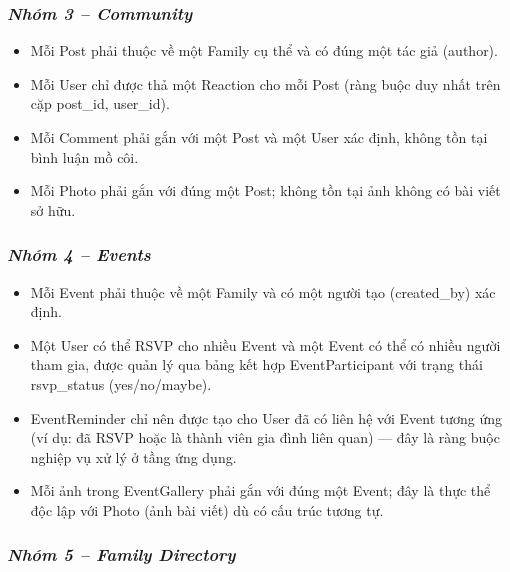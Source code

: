 \hypertarget{nhuxf3m-3-community}{%
\subsubsection{\texorpdfstring{\emph{\textbf{Nhóm 3 -- Community}}}{Nhóm 3 -- Community}}\label{nhuxf3m-3-community}}

\begin{itemize}
\item
  Mỗi Post phải thuộc về một Family cụ thể và có đúng một tác giả (author).
\item
  Mỗi User chỉ được thả một Reaction cho mỗi Post (ràng buộc duy nhất trên cặp post\_id, user\_id).
\item
  Mỗi Comment phải gắn với một Post và một User xác định, không tồn tại bình luận \textquotesingle mồ côi\textquotesingle.
\item
  Mỗi Photo phải gắn với đúng một Post; không tồn tại ảnh không có bài viết sở hữu.
\end{itemize}

\hypertarget{nhuxf3m-4-events}{%
\subsubsection{\texorpdfstring{\emph{\textbf{Nhóm 4 -- Events}}}{Nhóm 4 -- Events}}\label{nhuxf3m-4-events}}

\begin{itemize}
\item
  Mỗi Event phải thuộc về một Family và có một người tạo (created\_by) xác định.
\item
  Một User có thể RSVP cho nhiều Event và một Event có thể có nhiều người tham gia, được quản lý qua bảng kết hợp EventParticipant với trạng thái rsvp\_status (yes/no/maybe).
\item
  EventReminder chỉ nên được tạo cho User đã có liên hệ với Event tương ứng (ví dụ: đã RSVP hoặc là thành viên gia đình liên quan) --- đây là ràng buộc nghiệp vụ xử lý ở tầng ứng dụng.
\item
  Mỗi ảnh trong EventGallery phải gắn với đúng một Event; đây là thực thể độc lập với Photo (ảnh bài viết) dù có cấu trúc tương tự.
\end{itemize}

\hypertarget{nhuxf3m-5-family-directory}{%
\subsubsection{\texorpdfstring{\emph{\textbf{Nhóm 5 -- Family Directory}}}{Nhóm 5 -- Family Directory}}\label{nhuxf3m-5-family-directory}}

